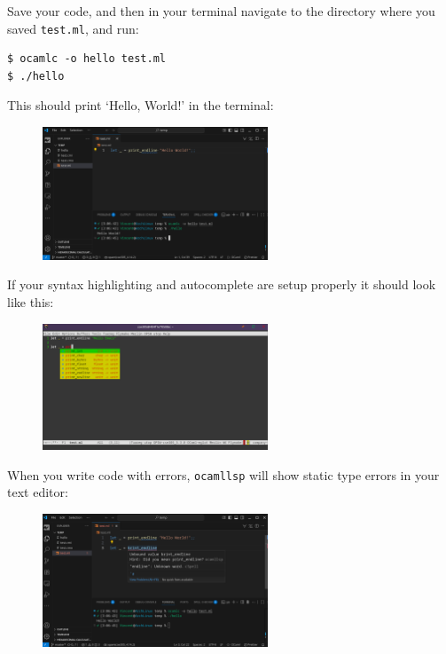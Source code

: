 \documentclass{extarticle}
\begin{document}
Save your code, and then in your terminal navigate to the directory where you saved \texttt{test.ml}, and run:
\begin{lstlisting}
$ ocamlc -o hello test.ml
$ ./hello
\end{lstlisting}
This should print `Hello, World!' in the terminal:
\begin{figure}[H]
  \centering
  \includegraphics[width=0.6\textwidth]{compile_success.png}
\end{figure}

If your syntax highlighting and autocomplete are setup properly it should look like this:
\begin{figure}[H]
  \centering
  \includegraphics[width=0.6\textwidth]{emacs_autocomplete.png}
\end{figure}

When you write code with errors, \texttt{ocamllsp} will show static type errors in your text editor:
\begin{figure}[H]
  \centering
  \includegraphics[width=0.6\textwidth]{static_check.png}
\end{figure}
\end{document}

